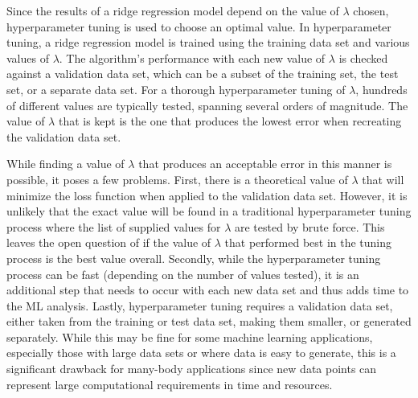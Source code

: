 Since the results of a ridge regression model depend on the value of $\lambda$ chosen, hyperparameter tuning is used to choose an optimal value. In hyperparameter tuning, a ridge regression model is trained using the training data set and various values of $\lambda$. The algorithm's performance with each new value of $\lambda$ is checked against a validation data set, which can be a subset of the training set, the test set, or a separate data set. For a thorough hyperparameter tuning of $\lambda$, hundreds of different values are typically tested, spanning several orders of magnitude. The value of $\lambda$ that is kept is the one that produces the lowest error when recreating the validation data set.

While finding a value of $\lambda$ that produces an acceptable error in this manner is possible, it poses a few problems. First, there is a theoretical value of $\lambda$ that will minimize the loss function when applied to the validation data set. However, it is unlikely that the exact value will be found in a traditional hyperparameter tuning process where the list of supplied values for $\lambda$ are tested by brute force. This leaves the open question of if the value of $\lambda$ that performed best in the tuning process is the best value overall. Secondly, while the hyperparameter tuning process can be fast (depending on the number of values tested), it is an additional step that needs to occur with each new data set and thus adds time to the ML analysis. Lastly, hyperparameter tuning requires a validation data set, either taken from the training or test data set, making them smaller, or generated separately. While this may be fine for some machine learning applications, especially those with large data sets or where data is easy to generate, this is a significant drawback for many-body applications since new data points can represent large computational requirements in time and resources.

